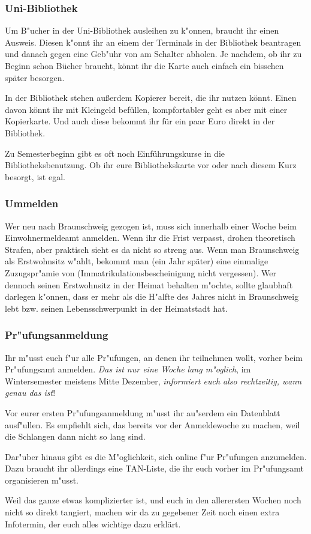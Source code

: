 \subsubsection{Uni-Bibliothek}

Um B"ucher in der Uni-Bibliothek ausleihen zu k"onnen, braucht ihr
einen Ausweis. Diesen k"onnt ihr an einem der Terminals in der
Bibliothek beantragen und danach gegen eine Geb"uhr von 
am Schalter abholen. Je nachdem, ob ihr zu Beginn schon Bücher braucht, 
könnt ihr die Karte auch einfach ein bisschen später besorgen.

In der Bibliothek stehen außerdem Kopierer bereit, die ihr nutzen könnt. 
Einen davon könnt ihr mit Kleingeld befüllen, kompfortabler geht es aber 
mit einer Kopierkarte. Und auch diese bekommt ihr für ein paar Euro 
direkt in der Bibliothek.

Zu Semesterbeginn gibt es oft noch Einführungskurse in die 
Bibliotheksbenutzung. Ob ihr eure Bibliothekskarte vor oder nach 
diesem Kurz besorgt, ist egal.

\subsubsection{Ummelden}

Wer neu nach Braunschweig gezogen ist, muss sich innerhalb einer
Woche beim Einwohnermeldeamt anmelden. Wenn ihr die Frist verpasst, 
drohen theoretisch Strafen, aber praktisch sieht es da nicht so 
streng aus. Wenn man Braunschweig als
Erstwohnsitz w"ahlt, bekommt man (ein Jahr später) eine einmalige 
Zuzugspr"amie von
 (Immatrikulationsbescheinigung nicht vergessen). Wer
dennoch seinen Erstwohnsitz in der Heimat behalten m"ochte, sollte
glaubhaft darlegen k"onnen, dass er mehr als die H"alfte des Jahres
nicht in Braunschweig lebt bzw. seinen Lebensschwerpunkt in der
Heimatstadt hat.

\subsubsection{Pr"ufungsanmeldung}

Ihr m"usst euch f"ur alle Pr"ufungen, an denen ihr teilnehmen
wollt, vorher beim Pr"ufungsamt anmelden. \emph{Das ist nur eine
Woche lang m"oglich}, im Wintersemester meistens Mitte Dezember,
\emph{informiert euch also rechtzeitig, wann genau das ist}!

Vor eurer ersten Pr"ufungsanmeldung m"usst ihr au"serdem ein
Datenblatt ausf"ullen. Es empfiehlt sich, das bereits vor der
Anmeldewoche zu machen, weil die Schlangen dann nicht so lang sind.

Dar"uber hinaus gibt es die M"oglichkeit, sich online f"ur
Pr"ufungen anzumelden. Dazu braucht ihr allerdings eine TAN-Liste,
die ihr euch vorher im Pr"ufungsamt organisieren m"usst.

Weil das ganze etwas komplizierter ist, und euch in den allerersten 
Wochen noch nicht so direkt tangiert, machen wir da zu gegebener Zeit 
noch einen extra Infotermin, der euch alles wichtige dazu erklärt.